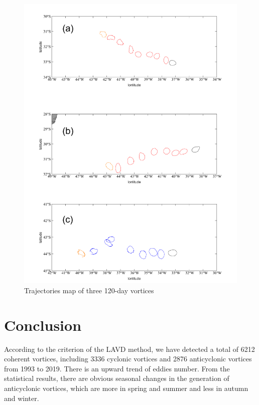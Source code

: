 \begin{figure}[htbp]
    \centering
    \includegraphics[width = 15cm]{chapter/figure/120-day eddies.png}
    \caption{Trajectories map of three 120-day vortices}
    \label{120-day eddies}
\end{figure}

\newpage

\section{Conclusion}

According to the criterion of the LAVD method, we have detected a total of 6212 coherent vortices, including 3336 cyclonic vortices and 2876 anticyclonic vortices from 1993 to 2019. There is an upward trend of eddies number. From the statistical results, there are obvious seasonal changes in the generation of anticyclonic vortices, which are more in spring and summer and less in autumn and winter.


